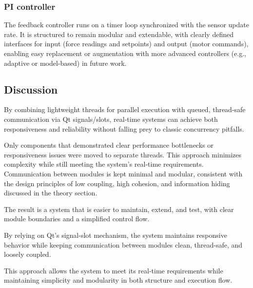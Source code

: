 \subsubsection{PI controller}
The feedback controller runs on a timer loop synchronized with the sensor update rate. It is structured to remain modular and extendable, with clearly defined interfaces for input (force readings and setpoints) and output (motor commands), enabling easy replacement or augmentation with more advanced controllers (e.g., adaptive or model-based) in future work.

\subsection{Discussion}


By combining lightweight threads for parallel execution with queued, thread-safe communication via Qt signals/slots, real-time systems can achieve both responsiveness and reliability without falling prey to classic concurrency pitfalls.

Only components that demonstrated clear performance bottlenecks or responsiveness issues were moved to separate threads. This approach minimizes complexity while still meeting the system’s real-time requirements. Communication between modules is kept minimal and modular, consistent with the design principles of low coupling, high cohesion, and information hiding discussed in the theory section.

The result is a system that is easier to maintain, extend, and test, with clear module boundaries and a simplified control flow.

By relying on Qt’s signal-slot mechanism, the system maintains responsive behavior while keeping communication between modules clean, thread-safe, and loosely coupled.

This approach allows the system to meet its real-time requirements while maintaining simplicity and modularity in both structure and execution flow.




